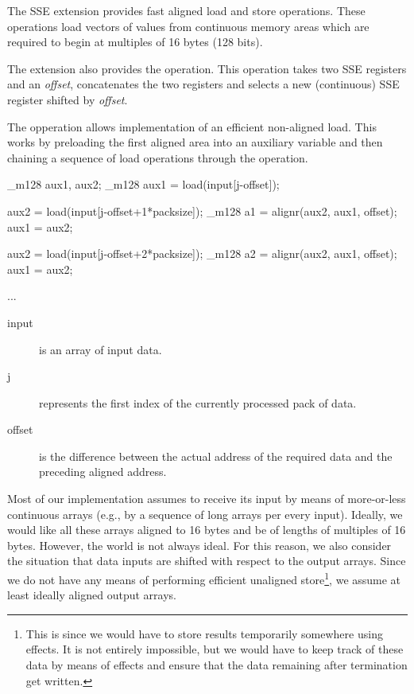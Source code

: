 
The SSE extension provides fast aligned load and store operations. These operations load vectors of values from continuous memory areas which are required to begin at multiples of 16 bytes (128 bits). 

The extension also provides the  operation. This operation takes two SSE registers and an \emph{offset}, concatenates the two registers and selects a new (continuous) SSE register shifted by \emph{offset}. 

The  opperation allows implementation of an efficient non-aligned load. This works by preloading the first aligned area into an auxiliary variable and then chaining a sequence of load operations through the  operation. 

\mybeginfig
\begin{code}
_m128 aux1, aux2;
_m128 aux1 = load(input[j-offset]);

aux2 = load(input[j-offset+1*packsize]);
_m128 a1 = alignr(aux2, aux1, offset);
aux1 = aux2;

aux2 = load(input[j-offset+2*packsize]);
_m128 a2 = alignr(aux2, aux1, offset);
aux1 = aux2;

...
\end{code}
\begin{description}
  \item[input] is an array of input data.
  \item[j] represents the first index of the currently processed pack of data.
  \item[offset] is the difference between the actual address of the required data and the preceding aligned address.
\end{description}

Most of our implementation assumes to receive its input by means of more-or-less continuous arrays (e.g., by a sequence of long arrays per every input). Ideally, we would like all these arrays aligned to 16 bytes and be of lengths of multiples of 16 bytes. However, the world is not always ideal. For this reason, we also consider the situation that data inputs are shifted with respect to the output arrays. Since we do not have any means of performing efficient unaligned store\footnote{This is since we would have to store results temporarily somewhere using effects. It is not entirely impossible, but we would have to keep track of these data by means of effects and ensure that the data remaining after termination get written.}, we assume at least ideally aligned output arrays.

